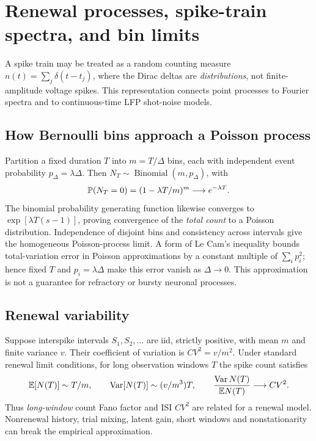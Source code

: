 \chapter[Spike-train renewal and spectra]{Renewal processes, spike-train spectra, and bin limits}
\label{ch:renewal-spectral}
A spike train may be treated as a random counting measure
$n(t)=\sum_j\delta(t-t_j)$, where the Dirac deltas are
\emph{distributions}, not finite-amplitude voltage spikes.
This representation connects point processes to Fourier spectra
and to continuous-time LFP shot-noise models.

\section{How Bernoulli bins approach a Poisson process}
Partition a fixed duration $T$ into $m=T/\Delta$ bins,
each with independent event probability $p_\Delta=\lambda\Delta$.
Then $N_T\sim\operatorname{Binomial}(m,p_\Delta)$, with
\[
\mathbb{P}(N_T=0)=(1-\lambda T/m)^m
\longrightarrow e^{-\lambda T}.
\]
The binomial probability generating function likewise converges
to $\exp[\lambda T(s-1)]$, proving convergence of the
\emph{total count} to a Poisson distribution. Independence
of disjoint bins and consistency across intervals give the
homogeneous Poisson-process limit. A form of Le Cam's inequality
bounds total-variation error in Poisson approximations by a
constant multiple of $\sum_i p_i^2$; hence fixed $T$ and
$p_i=\lambda\Delta$ make this error vanish as $\Delta\to0$.
This approximation is not a guarantee for refractory or bursty
neuronal processes.

\section{Renewal variability}
Suppose interspike intervals $S_1,S_2,\ldots$ are iid,
strictly positive, with mean $m$ and finite variance $v$.
Their coefficient of variation is $CV^2=v/m^2$.
Under standard renewal limit conditions, for long observation
windows $T$ the spike count satisfies
\[
\mathbb{E}[N(T)]\sim T/m,\qquad
\operatorname{Var}[N(T)]\sim (v/m^3)T,\qquad
\frac{\operatorname{Var} N(T)}{\mathbb{E} N(T)}\longrightarrow CV^2.
\]
Thus \emph{long-window} count Fano factor and ISI $CV^2$
are related for a renewal model. Nonrenewal history,
trial mixing, latent gain, short windows and nonstationarity
can break the empirical approximation.

